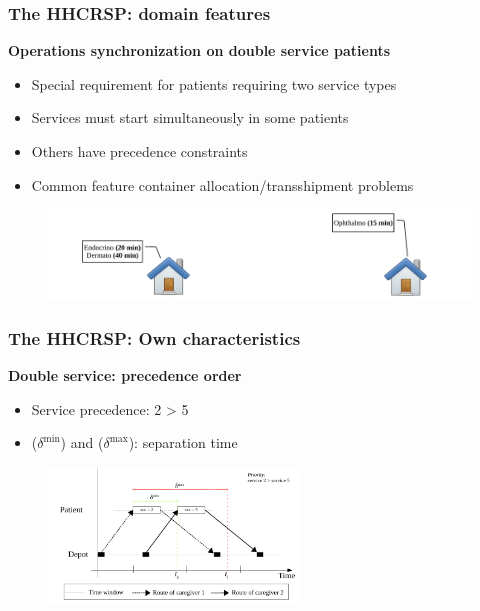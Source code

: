 \begin{frame}
   \frametitle{The HHCRSP: domain features}
   \textbf{Operations synchronization on double service patients}
   \begin{itemize}
      \item Special requirement for patients requiring two service types
      \item Services must start simultaneously in some patients
      \item Others have precedence constraints
      \item Common feature container allocation/transshipment problems \citep{drexl2012synchronization}
   \end{itemize}


   \begin{figure}[H]
      \includegraphics[width=1\textwidth,page=2]{fig/skilled}
   \end{figure}

\end{frame}

\begin{frame}
   \frametitle{The HHCRSP: Own characteristics}
   \textbf{Double service: precedence order}
   \begin{itemize}
      \item Service precedence: 2 > 5
      \item ($\delta^\mathrm{min}$) and ($\delta^\mathrm{max}$): separation time
   \end{itemize}

   \begin{figure}
      \centering
      \includegraphics[width=0.6\textwidth,page=1]{fig/sync-tsn2}
   \end{figure}
\end{frame}

